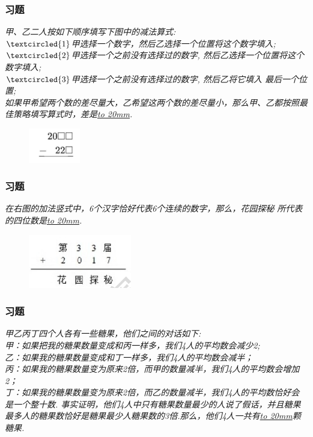 \begin{frame}
    \frametitle{习题\theframecounter}
    \textit{甲、乙二人按如下顺序填写下图中的减法算式:\\
    $\textcircled{1}$甲选择一个数字，然后乙选择一个位置将这个数字填入;\\
    $\textcircled{2}$甲选择一个之前没有选择过的数字, 然后乙选择一个位置将这个数字填入;\\
    $\textcircled{3}$甲选择一个之前没有选择过的数字, 然后乙将它填入    最后一个位置;\\
    如果甲希望两个数的差尽量大，乙希望这两个数的差尽量小，那么甲、乙都按照最佳策略填写算式时，差是\underline{\hbox to 20mm{}}.}
    \begin{figure}[H] 
        \centering
        \includegraphics[width=0.2\textwidth]{./pics/Chapter_7/11.png}
    \end{figure}
\end{frame}


\begin{frame}
    \frametitle{习题\theframecounter}
    \vspace*{-1cm}
    \textit{在右图的加法竖式中，6个汉字恰好代表6个连续的数字，那么，花园探秘 所代表的四位数是\underline{\hbox to 20mm{}}.}
    \begin{figure}[H] 
        \centering
        \includegraphics[width=0.4\textwidth]{./pics/Chapter_7/12.png}
    \end{figure}
\end{frame}


\begin{frame}
    \frametitle{习题\theframecounter}
    \textit{甲乙丙丁四个人各有一些糖果，他们之间的对话如下:\\
    甲：如果把我的糖果数量变成和丙一样多，我们4人的平均数会减少2;\\
    乙：如果我的糖果数量变成和丁一样多，我们4人的平均数会减半；\\
    丙：如果我的糖果数量变为原来2倍，而甲的数量减半，我们4人的平均数会增加 2；\\
    丁：如果我的糖果数量变为原来2倍，而乙的数量减半，我们4人的平均数恰好会是一个整十数.
事实证明，他们4人中只有糖果数量最少的人说了假话，并且糖果最多人的糖果数恰好是糖果最少人糖果数的3倍.那么，他们4人一共有\underline{\hbox to 20mm{}}颗糖果.}
\end{frame}

